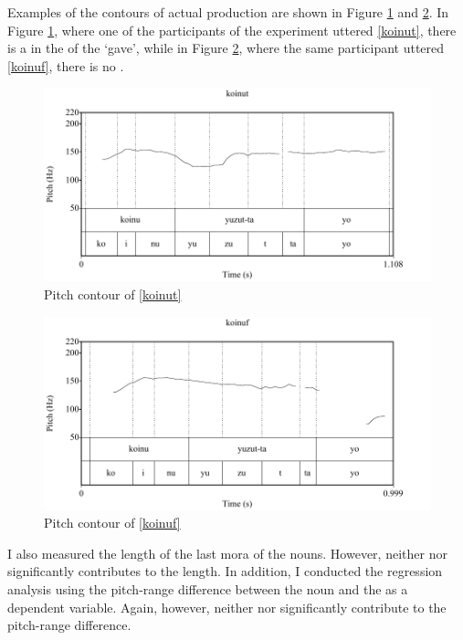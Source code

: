 Examples of the  contours of actual production are shown
in Figure \ref{Int:Fig:koinut} and \ref{Int:Fig:koinuf}.
In Figure \ref{Int:Fig:koinut},
where one of the participants of the experiment uttered \ref{koinut},
there is a  in the  of the   `gave',
while in Figure \ref{Int:Fig:koinuf},
where the same participant uttered \ref{koinuf},
there is no .

\begin{figure}
	\begin{center}
		\includegraphics[width=.6\textwidth]{figure/pitcht.pdf}
	\end{center}
	\caption{Pitch contour of \ref{koinut}}
	\label{Int:Fig:koinut}
\end{figure}
\begin{figure}
	\begin{center}
		\includegraphics[width=.6\textwidth]{figure/pitchf.pdf}
	\end{center}
	\caption{Pitch contour of \ref{koinuf}}
	\label{Int:Fig:koinuf}
\end{figure}

I also measured the  length of the last mora of the nouns.
However, neither  nor  significantly contributes to the  length.
In addition, I conducted the regression analysis
using the pitch-range difference between the noun and the  as a dependent variable.
Again, however,
neither  nor  significantly contribute to the pitch-range difference.


